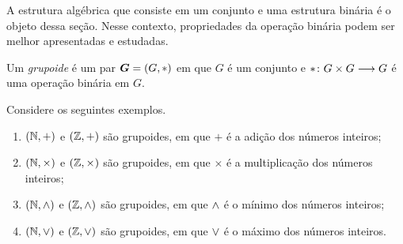 \begin{comment}
\begin{definition}
Seja $X$ um conjunto. Uma operação binária \emph{associativa} é uma operação binária $\fun{\opb}{X \times X}{X}$ que satisfaz
	\begin{itemize}
	\item (Associatividade) Para todos $x,x',x'' \in X$,
		\begin{equation*}
		(x \opb x') \opb x'' = x \opb (x' \opb x'').
		\end{equation*}
	\end{itemize}
Uma operação binária \emph{comutativa} é uma operação binária $\fun{\opb}{X \times X}{X}$ que satisfaz
	\begin{itemize}
	\item (Comutatividade) Para todos $x,x' \in X$
		\begin{equation*}
		x \opb x' = x' \opb x.
		\end{equation*}
	\end{itemize}
\end{definition}

\begin{definition}
Sejam $X$ um conjunto e $+$ uma operação binária em $X$. Uma operação binária \emph{distributiva} sobre $+$ é uma operação binária $\times$ em $X$ que satisfaz
	\begin{itemize}
	\item (Distributividade) Para todos $x,x',x'' \in X$,
	\begin{equation*}
	x \times (x' + x'') = (x \times x') + (x \times x'').
	\end{equation*}
	\end{itemize}
\end{definition}
\end{comment}

A estrutura algébrica que consiste em um conjunto e uma estrutura binária é o objeto dessa seção. Nesse contexto, propriedades da operação binária podem ser melhor apresentadas e estudadas.

\begin{definition}
Um \emph{grupoide} é um par $\bm G=(G,\ast)$ em que $G$ é um conjunto e $\ast\colon \allowbreak G \times G \longrightarrow G$ é uma operação binária em $G$.
\end{definition}

\begin{example}
Considere os seguintes exemplos.
	\begin{enumerate}
	\item $(\mathbb{N},+)$ e $(\mathbb{Z},+)$ são grupoides, em que $+$ é a adição dos números inteiros;
	\item $(\mathbb{N},\times)$ e $(\mathbb{Z},\times)$ são grupoides, em que $\times$ é a multiplicação dos números inteiros;
	\item $(\mathbb{N},\mathbin{\wedge})$ e $(\mathbb{Z},\mathbin{\wedge})$ são grupoides, em que $\mathbin{\wedge}$ é o mínimo dos números inteiros;
	\item $(\mathbb{N},\mathbin{\vee})$ e $(\mathbb{Z},\mathbin{\vee})$ são grupoides, em que $\mathbin{\vee}$ é o máximo dos números inteiros.
	\end{enumerate}
\end{example}

